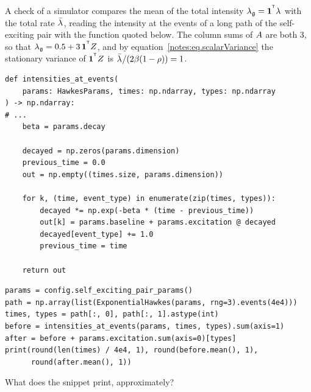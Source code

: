 \begin{question}
\label{question.palmMeanOfTheTotalIntensity}
A check of a simulator compares the mean of the total intensity
$\totalIntensity = \mathbf{1}^{\transpose}\intensity[ ]$ with the total rate $\totalRate$,
reading the intensity at the events of a long path of the self-exciting pair
with the function quoted below.
The column sums of $\excitation$ are both 3,
so that $\totalIntensity = 0.5 + 3 \, \mathbf{1}^{\transpose}\decayedCounts$,
and by equation~\eqref{notes:eq.scalarVariance}
the stationary variance of $\mathbf{1}^{\transpose}\decayedCounts$ is
$\totalRate / (2\decay(1-\branchingRatio)) = 1$.
\begin{lstlisting}[caption={\protect\codehl{unito26.lob.hawkes.intensities\_at\_events}, its docstring elided.}, label=listing.palmIntensitiesAtEvents]
def intensities_at_events(
    params: HawkesParams, times: np.ndarray, types: np.ndarray
) -> np.ndarray:
# ...
    beta = params.decay

    decayed = np.zeros(params.dimension)
    previous_time = 0.0
    out = np.empty((times.size, params.dimension))

    for k, (time, event_type) in enumerate(zip(times, types)):
        decayed *= np.exp(-beta * (time - previous_time))
        out[k] = params.baseline + params.excitation @ decayed
        decayed[event_type] += 1.0
        previous_time = time

    return out
\end{lstlisting}
\begin{lstlisting}[caption={The total intensity at the events, before and after the jump}, label=listing.palmMeanRun]
params = config.self_exciting_pair_params()
path = np.array(list(ExponentialHawkes(params, rng=3).events(4e4)))
times, types = path[:, 0], path[:, 1].astype(int)
before = intensities_at_events(params, times, types).sum(axis=1)
after = before + params.excitation.sum(axis=0)[types]
print(round(len(times) / 4e4, 1), round(before.mean(), 1),
      round(after.mean(), 1))
\end{lstlisting}
What does the snippet print, approximately?
\begin{choices}
 \choice {}
 \correctchoice {}
 \choice {}
 \choice {}
\end{choices}
\end{question}

